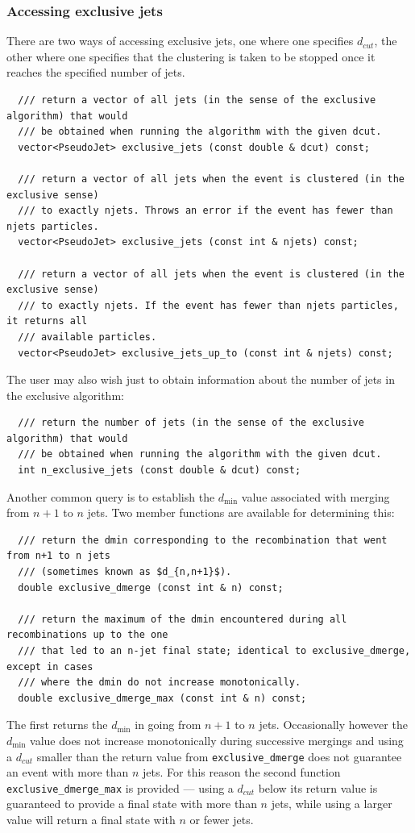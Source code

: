 \documentclass[12pt,a4]{article}
\newcommand{\ttt}[1]{{\small\texttt{#1}}}
\begin{document}
\subsubsection{Accessing exclusive jets}
There are two ways of accessing exclusive jets,
one where one specifies
$d_{cut}$, the other where one specifies that the clustering is taken
to be stopped once it reaches the specified number of jets.
\begin{lstlisting}
  /// return a vector of all jets (in the sense of the exclusive algorithm) that would 
  /// be obtained when running the algorithm with the given dcut.
  vector<PseudoJet> exclusive_jets (const double & dcut) const;

  /// return a vector of all jets when the event is clustered (in the exclusive sense) 
  /// to exactly njets. Throws an error if the event has fewer than njets particles.
  vector<PseudoJet> exclusive_jets (const int & njets) const;

  /// return a vector of all jets when the event is clustered (in the exclusive sense) 
  /// to exactly njets. If the event has fewer than njets particles, it returns all
  /// available particles.
  vector<PseudoJet> exclusive_jets_up_to (const int & njets) const;
\end{lstlisting}
%
The user may also wish just to obtain information about the number of
jets in the exclusive algorithm:
\begin{lstlisting}
  /// return the number of jets (in the sense of the exclusive algorithm) that would 
  /// be obtained when running the algorithm with the given dcut.
  int n_exclusive_jets (const double & dcut) const;
\end{lstlisting}
Another common query is to establish the $d_{\min}$ value associated
with merging from $n+1$ to $n$ jets. Two member functions are
available for determining this:
\begin{lstlisting}
  /// return the dmin corresponding to the recombination that went from n+1 to n jets 
  /// (sometimes known as $d_{n,n+1}$).
  double exclusive_dmerge (const int & n) const;

  /// return the maximum of the dmin encountered during all recombinations up to the one 
  /// that led to an n-jet final state; identical to exclusive_dmerge, except in cases 
  /// where the dmin do not increase monotonically.
  double exclusive_dmerge_max (const int & n) const;
\end{lstlisting}
The first returns the $d_{\min}$  in going from $n+1$ to $n$ jets. 
%
Occasionally however the $d_{\min}$ value does not increase
monotonically during successive mergings and using a $d_{cut}$ smaller
than the return value from \ttt{exclusive\_dmerge} does not guarantee
an event with more than $n$ jets.
%
For this reason the second function \ttt{exclusive\_dmerge\_max} is
provided --- using a $d_{cut}$ below its return value is guaranteed to
provide a final state with more than $n$ jets, while using a larger
value will return a final state with $n$ or fewer jets.
\end{document}
